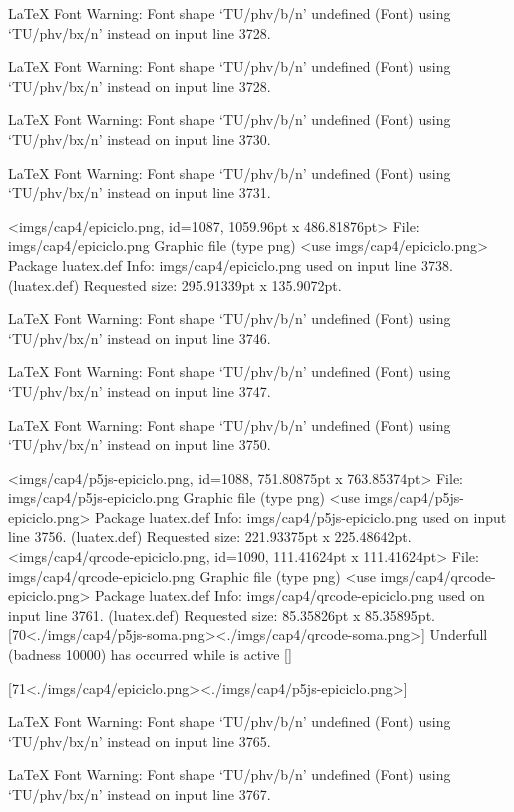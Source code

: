 LaTeX Font Warning: Font shape `TU/phv/b/n' undefined
(Font)              using `TU/phv/bx/n' instead on input line 3728.


LaTeX Font Warning: Font shape `TU/phv/b/n' undefined
(Font)              using `TU/phv/bx/n' instead on input line 3728.


LaTeX Font Warning: Font shape `TU/phv/b/n' undefined
(Font)              using `TU/phv/bx/n' instead on input line 3730.


LaTeX Font Warning: Font shape `TU/phv/b/n' undefined
(Font)              using `TU/phv/bx/n' instead on input line 3731.

<imgs/cap4/epiciclo.png, id=1087, 1059.96pt x 486.81876pt>
File: imgs/cap4/epiciclo.png Graphic file (type png)
<use imgs/cap4/epiciclo.png>
Package luatex.def Info: imgs/cap4/epiciclo.png  used on input line 3738.
(luatex.def)             Requested size: 295.91339pt x 135.9072pt.

LaTeX Font Warning: Font shape `TU/phv/b/n' undefined
(Font)              using `TU/phv/bx/n' instead on input line 3746.


LaTeX Font Warning: Font shape `TU/phv/b/n' undefined
(Font)              using `TU/phv/bx/n' instead on input line 3747.


LaTeX Font Warning: Font shape `TU/phv/b/n' undefined
(Font)              using `TU/phv/bx/n' instead on input line 3750.

<imgs/cap4/p5js-epiciclo.png, id=1088, 751.80875pt x 763.85374pt>
File: imgs/cap4/p5js-epiciclo.png Graphic file (type png)
<use imgs/cap4/p5js-epiciclo.png>
Package luatex.def Info: imgs/cap4/p5js-epiciclo.png  used on input line 3756.
(luatex.def)             Requested size: 221.93375pt x 225.48642pt.
<imgs/cap4/qrcode-epiciclo.png, id=1090, 111.41624pt x 111.41624pt>
File: imgs/cap4/qrcode-epiciclo.png Graphic file (type png)
<use imgs/cap4/qrcode-epiciclo.png>
Package luatex.def Info: imgs/cap4/qrcode-epiciclo.png  used on input line 3761.
(luatex.def)             Requested size: 85.35826pt x 85.35895pt.
[70<./imgs/cap4/p5js-soma.png><./imgs/cap4/qrcode-soma.png>]
Underfull \vbox (badness 10000) has occurred while \output is active []

[71<./imgs/cap4/epiciclo.png><./imgs/cap4/p5js-epiciclo.png>]

LaTeX Font Warning: Font shape `TU/phv/b/n' undefined
(Font)              using `TU/phv/bx/n' instead on input line 3765.


LaTeX Font Warning: Font shape `TU/phv/b/n' undefined
(Font)              using `TU/phv/bx/n' instead on input line 3767.


